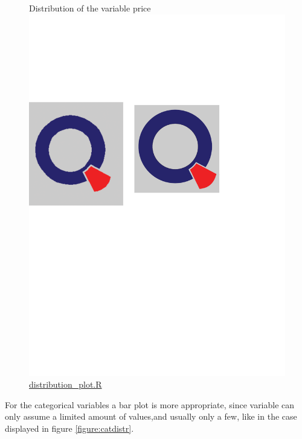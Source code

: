 \begin{figure}[H]
\caption{Distribution of the variable price \protect\includegraphics[scale=0.05]{qletlogo.pdf} {\href{https://github.com/silvia-ventoruzzo/SPL-WISE-2018/blob/master/Helpers/distribution_plot.R}{distribution\_plot.R}}}
\centering
\label{figure:numdistr}
\end{figure}

For the categorical variables a bar plot is more appropriate, since variable can only assume a limited amount of values,and usually only a few, like in the case displayed in figure \ref{figure:catdistr}.

